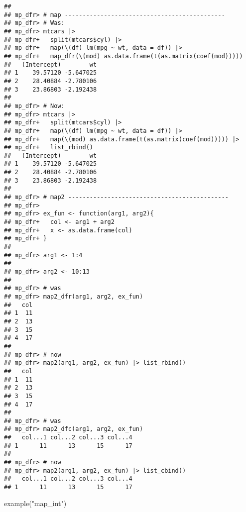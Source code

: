 \documentclass[
]{book}
\newenvironment{Shaded}{\begin{snugshade}}{\end{snugshade}}
\newcommand{\FunctionTok}[1]{\textcolor[rgb]{0.00,0.00,0.00}{#1}}
\newcommand{\NormalTok}[1]{#1}
\newcommand{\StringTok}[1]{\textcolor[rgb]{0.31,0.60,0.02}{#1}}
\begin{document}
\begin{verbatim}
## 
## mp_dfr> # map ---------------------------------------------
## mp_dfr> # Was:
## mp_dfr> mtcars |>
## mp_dfr+   split(mtcars$cyl) |>
## mp_dfr+   map(\(df) lm(mpg ~ wt, data = df)) |>
## mp_dfr+   map_dfr(\(mod) as.data.frame(t(as.matrix(coef(mod)))))
##   (Intercept)        wt
## 1    39.57120 -5.647025
## 2    28.40884 -2.780106
## 3    23.86803 -2.192438
## 
## mp_dfr> # Now:
## mp_dfr> mtcars |>
## mp_dfr+   split(mtcars$cyl) |>
## mp_dfr+   map(\(df) lm(mpg ~ wt, data = df)) |>
## mp_dfr+   map(\(mod) as.data.frame(t(as.matrix(coef(mod))))) |>
## mp_dfr+   list_rbind()
##   (Intercept)        wt
## 1    39.57120 -5.647025
## 2    28.40884 -2.780106
## 3    23.86803 -2.192438
## 
## mp_dfr> # map2 ---------------------------------------------
## mp_dfr> 
## mp_dfr> ex_fun <- function(arg1, arg2){
## mp_dfr+   col <- arg1 + arg2
## mp_dfr+   x <- as.data.frame(col)
## mp_dfr+ }
## 
## mp_dfr> arg1 <- 1:4
## 
## mp_dfr> arg2 <- 10:13
## 
## mp_dfr> # was
## mp_dfr> map2_dfr(arg1, arg2, ex_fun)
##   col
## 1  11
## 2  13
## 3  15
## 4  17
## 
## mp_dfr> # now
## mp_dfr> map2(arg1, arg2, ex_fun) |> list_rbind()
##   col
## 1  11
## 2  13
## 3  15
## 4  17
## 
## mp_dfr> # was
## mp_dfr> map2_dfc(arg1, arg2, ex_fun)
##   col...1 col...2 col...3 col...4
## 1      11      13      15      17
## 
## mp_dfr> # now
## mp_dfr> map2(arg1, arg2, ex_fun) |> list_cbind()
##   col...1 col...2 col...3 col...4
## 1      11      13      15      17
\end{verbatim}

\begin{Shaded}
\begin{Highlighting}[]
\FunctionTok{example}\NormalTok{(}\StringTok{"map\_int"}\NormalTok{)}
\end{Highlighting}
\end{Shaded}
\end{document}
